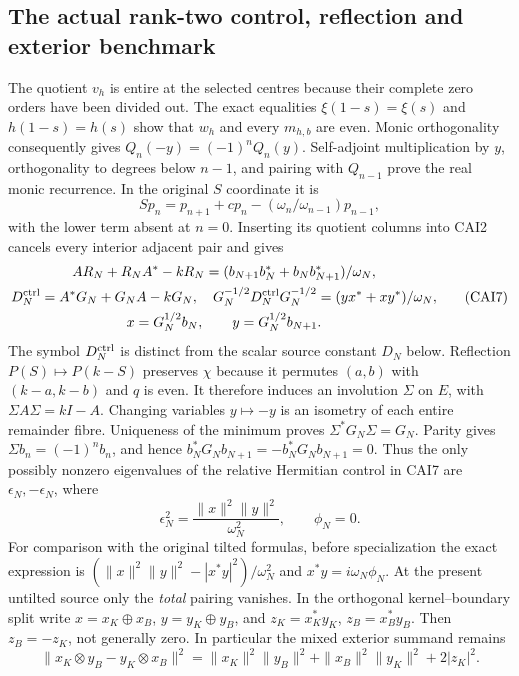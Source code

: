 \documentclass[11pt,a4paper]{article}
\begin{document}
\subsection{The actual rank-two control, reflection and exterior benchmark}

The quotient $v_h$ is entire at the selected centres because their
complete zero orders have been divided out. The exact equalities
$\xi(1-s)=\xi(s)$ and $h(1-s)=h(s)$ show that $w_h$ and every $m_{h,b}$
are even. Monic orthogonality consequently gives $Q_n(-y)=(-1)^nQ_n(y)$.
Self-adjoint multiplication by $y$, orthogonality to degrees below
$n-1$, and pairing with $Q_{n-1}$ prove the real monic recurrence.
In the original $S$ coordinate it is
\[
 Sp_n=p_{n+1}+cp_n-(\omega_n/\omega_{n-1})p_{n-1},\tag{CAI6}
\]
with the lower term absent at $n=0$. Inserting its quotient columns into
CAI2 cancels every interior adjacent pair and gives
\[
\begin{gathered}
 AR_N+R_NA^*-kR_N=(b_{N+1}b_N^*+b_Nb_{N+1}^*)/\omega_N,\\
 D_N^{\rm ctrl}=A^*G_N+G_NA-kG_N,\quad
 G_N^{-1/2}D_N^{\rm ctrl}G_N^{-1/2}=(yx^*+xy^*)/\omega_N,\\
 x=G_N^{1/2}b_N,\qquad y=G_N^{1/2}b_{N+1}.
\end{gathered}\tag{CAI7}
\]
The symbol $D_N^{\rm ctrl}$ is distinct from the scalar source constant
$D_N$ below. Reflection $P(S)\mapsto P(k-S)$ preserves $\chi$ because
it permutes $(a,b)$ with $(k-a,k-b)$ and $q$ is even. It therefore induces
an involution $\Sigma$ on $E$, with $\Sigma A\Sigma=kI-A$.
Changing variables $y\mapsto-y$ is an isometry of each entire remainder
fibre. Uniqueness of the minimum proves $\Sigma^*G_N\Sigma=G_N$.
Parity gives $\Sigma b_n=(-1)^nb_n$, and hence
$b_N^*G_Nb_{N+1}=-b_N^*G_Nb_{N+1}=0$. Thus the only possibly nonzero
eigenvalues of the relative Hermitian control in CAI7 are
$\epsilon_N,-\epsilon_N$, where
\[
 \epsilon_N^2=\frac{\|x\|^2\|y\|^2}{\omega_N^2},\qquad
 \phi_N=0.\tag{CAI8}
\]
For comparison with the original tilted formulas, before specialization
the exact expression is
$(\|x\|^2\|y\|^2-|x^*y|^2)/\omega_N^2$ and
$x^*y=i\omega_N\phi_N$. At the present untilted source only the
\emph{total} pairing vanishes. In the orthogonal kernel--boundary split
write $x=x_K\oplus x_B$, $y=y_K\oplus y_B$, and
$z_K=x_K^*y_K$, $z_B=x_B^*y_B$. Then $z_B=-z_K$, not generally zero.
In particular the mixed exterior summand remains
\[
 \|x_K\otimes y_B-y_K\otimes x_B\|^2
 =\|x_K\|^2\|y_B\|^2+\|x_B\|^2\|y_K\|^2+2|z_K|^2.\tag{CAI9}
\]
\end{document}
